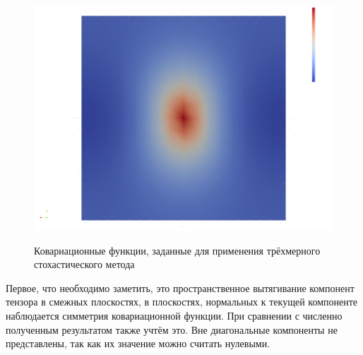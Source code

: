 \begin{figure}[!ht]
{        \hfill
        {\includegraphics[width=0.32\linewidth]{images/kriging/3components/exact_cov_22_zz.png}}
    }
    
    \onehalfspacing{}
    \caption{Ковариационные функции, заданные для применения трёхмерного стохастического метода}
    \label{img:exact_covariance_comparison_heat_maps}  
\end{figure}

Первое, что необходимо заметить, это пространственное вытягивание компонент тензора в смежных плоскостях, в плоскостях, нормальных к текущей компоненте наблюдается симметрия ковариационной функции. При сравнении с численно полученным результатом также учтём это. Вне диагональные компоненты не представлены, так как их значение можно считать нулевыми.

